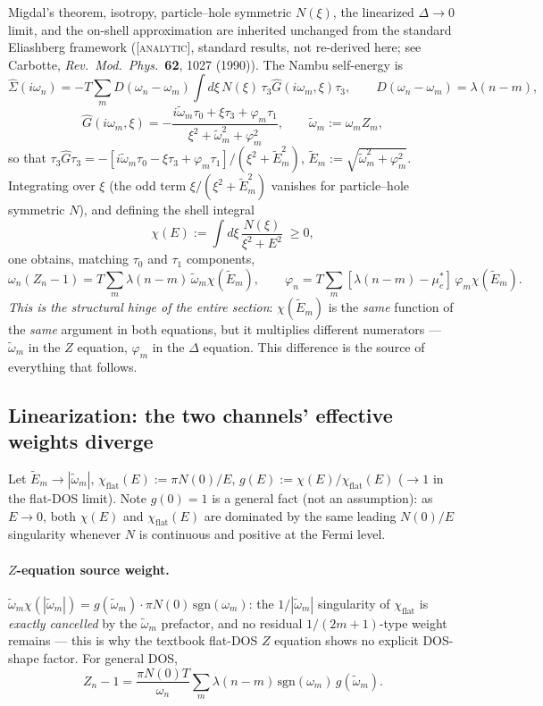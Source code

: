 \documentclass[11pt]{article}
\begin{document}
Migdal's theorem, isotropy, particle--hole symmetric $N(\xi)$, the linearized
$\Delta\to0$ limit, and the on-shell approximation are inherited unchanged
from the standard Eliashberg framework (\textsc{[analytic]}, standard
results, not re-derived here; see Carbotte, \emph{Rev.\ Mod.\ Phys.}\ \textbf{62},
1027 (1990)). The Nambu self-energy is
\[
 \hat\Sigma(i\omega_n)=-T\sum_m D(\omega_n-\omega_m)\int d\xi\,N(\xi)\,\tau_3\hat G(i\omega_m,\xi)\tau_3,
 \qquad D(\omega_n-\omega_m)=\lambda(n-m),
\]
\[
 \hat G(i\omega_m,\xi)=-\frac{i\tilde\omega_m\tau_0+\xi\tau_3+\varphi_m\tau_1}{\xi^2+\tilde\omega_m^2+\varphi_m^2},
 \qquad \tilde\omega_m:=\omega_mZ_m,
\]
so that $\tau_3\hat G\tau_3=-[i\tilde\omega_m\tau_0-\xi\tau_3+\varphi_m\tau_1]/(\xi^2+\tilde E_m^2)$,
$\tilde E_m:=\sqrt{\tilde\omega_m^2+\varphi_m^2}$. Integrating over $\xi$ (the
odd term $\xi/(\xi^2+\tilde E_m^2)$ vanishes for particle--hole symmetric
$N$), and defining the shell integral
\[
 \chi(E):=\int d\xi\,\frac{N(\xi)}{\xi^2+E^2}\;\ge0,
\]
one obtains, matching $\tau_0$ and $\tau_1$ components,
\begin{equation}\label{eq:zdeq}
 \omega_n(Z_n-1)=T\sum_m\lambda(n-m)\,\tilde\omega_m\chi(\tilde E_m),
 \qquad
 \varphi_n=T\sum_m[\lambda(n-m)-\mu^*_c]\,\varphi_m\chi(\tilde E_m).
\end{equation}
\emph{This is the structural hinge of the entire section}: $\chi(\tilde E_m)$
is the \emph{same} function of the \emph{same} argument in both equations,
but it multiplies different numerators --- $\tilde\omega_m$ in the $Z$
equation, $\varphi_m$ in the $\Delta$ equation. This difference is the
source of everything that follows.

\subsection{Linearization: the two channels' effective weights diverge}

Let $\tilde E_m\to|\tilde\omega_m|$, $\chi_{\text{flat}}(E):=\pi N(0)/E$,
$g(E):=\chi(E)/\chi_{\text{flat}}(E)$ ($\to1$ in the flat-DOS limit). Note
$g(0)=1$ is a general fact (not an assumption): as $E\to0$, both $\chi(E)$
and $\chi_{\text{flat}}(E)$ are dominated by the same leading $N(0)/E$
singularity whenever $N$ is continuous and positive at the Fermi level.

\paragraph{$Z$-equation source weight.}
$\tilde\omega_m\chi(|\tilde\omega_m|)=g(\tilde\omega_m)\cdot\pi N(0)\,\mathrm{sgn}(\omega_m)$:
the $1/|\tilde\omega_m|$ singularity of $\chi_{\text{flat}}$ is \emph{exactly
cancelled} by the $\tilde\omega_m$ prefactor, and no residual
$1/(2m{+}1)$-type weight remains --- this is why the textbook flat-DOS $Z$
equation shows no explicit DOS-shape factor. For general DOS,
\[
 Z_n-1=\frac{\pi N(0)T}{\omega_n}\sum_m\lambda(n-m)\,\mathrm{sgn}(\omega_m)\,g(\tilde\omega_m).
\]
\end{document}
